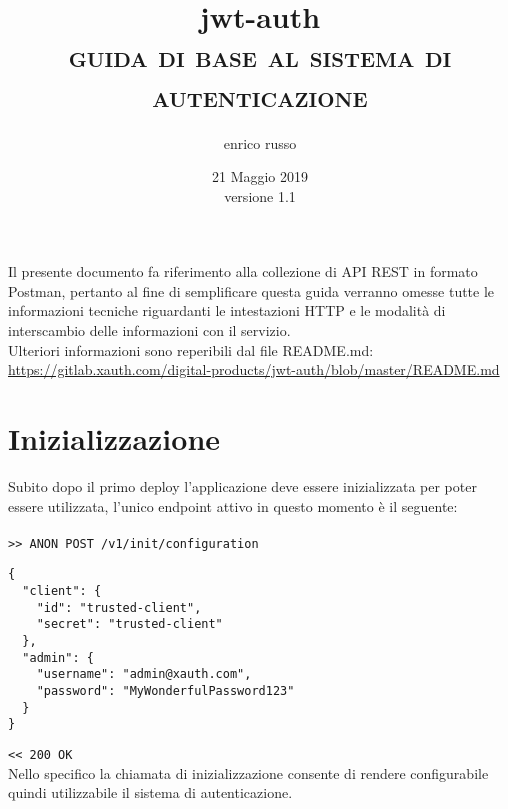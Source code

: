 \documentclass[a4paper,12pt]{article}
\begin{document}
\title{\textbf{jwt-auth}\\ \textsc{guida di base al sistema di autenticazione}}
\author{enrico russo}
\date{21 Maggio 2019 \\ \phantom{} versione 1.1}

\maketitle


Il presente documento fa riferimento alla collezione di API REST in formato Postman, pertanto al fine di semplificare questa guida verranno omesse tutte le informazioni tecniche riguardanti le intestazioni HTTP e le modalità di interscambio delle informazioni con il servizio.\\

Ulteriori informazioni sono reperibili dal file README.md:\\
\href{}{https://gitlab.xauth.com/digital-products/jwt-auth/blob/master/README.md}

\section{Inizializzazione}
Subito dopo il primo deploy l'applicazione deve essere inizializzata per poter essere utilizzata, l'unico endpoint attivo in questo momento è il seguente:\\
\\
\texttt{>> ANON POST /v1/init/configuration}

\begin{lstlisting}
{
  "client": {
    "id": "trusted-client",
    "secret": "trusted-client"
  },
  "admin": {
    "username": "admin@xauth.com",
    "password": "MyWonderfulPassword123"
  }
}
\end{lstlisting}
\texttt{<< 200 OK} \\

Nello specifico la chiamata di inizializzazione consente di rendere configurabile quindi utilizzabile il sistema di autenticazione.
\end{document}

